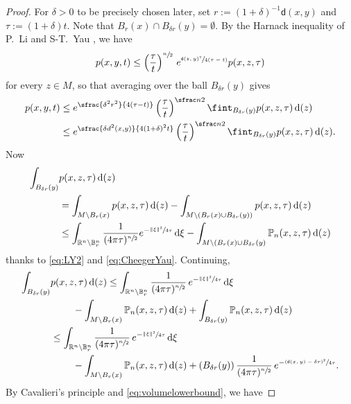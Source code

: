\documentclass[JEP,XML,SOM,Unicode,published]{cedram}
\newcommand{\NoChangel}[1]{%
\expandafter\let\csname old\string#1\endcsname=#1
\let#1=\relax
\newcommand{#1}{\mathcode`l="716C\csname old\string#1\endcsname\mathcode`l="7160 }%
}
\theoremstyle{plain}
\theoremstyle{definition}
\newcommand{\setR}{\mathbb{R}}
\newcommand{\bP}{\mathbb{P}}
\newcommand{\setB}{\mathbb{B}}
\newcommand{\di}{\mathop{}\!\mathrm{d}}
\newcommand{\dist}{\mathsf{d}}
\DeclareMathOperator{\vol}{vol}\NoChangel{\vol}
\begin{document}
\begin{proof}
For $\delta>0$ to be precisely chosen later, set $r:=(1+\delta)^{-1}\dist(x,y)$ and $\tau:= (1+\delta)t$. Note that $B_{r}(x) \cap B_{\delta r}(y) = \emptyset$. By the Harnack inequality of P.~Li and S-T.~Yau \cite{LiYau}, we have
\begin{equation}\label{LY}
p(x,y,t)\le \left(\frac{\tau}{t}\right)^{\sfrac n2}\, e^{\sfrac{\dist(z,y)^2}{4(\tau-t)}} p(x,z,\tau)\end{equation}
for every $z\in M$, so that averaging over the ball $B_{\delta r}(y)$ gives
\begin{equation}
\begin{aligned}\label{eq:Colding111}p(x,y,t)&\le e^{\sfrac{\delta^2r^2}{4(\tau-t)} } \left(\frac{\tau}{t}\right)^{\sfrac n2}\fint_{B_{\delta r}(y)}p(x,z,\tau)\di\vol(z) \\
&\le e^{\sfrac{\delta d^2(x,y)}{4(1+\delta)^2t}} \left(\frac{\tau}{t}\right)^{\sfrac n2}\fint_{B_{\delta r}(y)}p(x,z,\tau)\di\vol(z).
\end{aligned}
\end{equation}
Now
\begin{align*}
\int_{B_{\delta r}(y)}&p(x,z,\tau)\di \vol(z)\\
&=\int_{M\setminus B_r(x)}p(x,z,\tau)\di \vol(z)- \int_{M\setminus (B_r(x)\cup B_{\delta r}(y))} p(x,z,\tau)\di \vol(z)\\
&\le \int_{\setR^n\setminus \mathbb{B}_r^n}\frac{1}{(4\pi \tau)^{\sfrac n2}}e^{-\sfrac{\|\xi\|^2}{4\tau}}\di \xi - \int_{M\setminus (B_r(x)\cup B_{\delta r}(y)}\mathbb{P}_n(x,z,\tau)\di \vol(z)
\end{align*}
thanks to \eqref{eq:LY2} and \eqref{eq:CheegerYau}. Continuing,
\begin{align*}
\int_{B_{\delta r}(y)}&p(x,z,\tau)\di \vol(z) \le \int_{\setR^n\setminus \setB_r^n}\frac{1}{(4\pi \tau)^{\sfrac n2}}\,e^{-\sfrac{\|\xi\|^2}{4\tau}}\di \xi\\
&\hspace*{.8cm} - \int_{M\setminus B_r(x)}\bP_n(x,z,\tau)\di \vol(z)
+ \int_{B_{\delta r}(y)}\bP_n(x,z,\tau)\di \vol(z)\\
&\le \int_{\setR^n\setminus \setB_r^n}\frac{1}{(4\pi \tau)^{\sfrac n2}}\,e^{-\sfrac{\|\xi\|^2}{4\tau}}\di \xi \\
&\hspace*{.8cm}- \int_{M\setminus B_r(x)}\bP_n(x,z,\tau)\di \vol(z)+\vol(B_{\delta r}(y))\, \frac{1}{(4\pi \tau)^{\sfrac n2}}\,e^{-\sfrac{(\dist(x,y)-\delta r)^2}{4\tau}}.
\end{align*}
By Cavalieri's principle and \eqref{eq:volumelowerbound}, we have

\end{proof}
\end{document}
